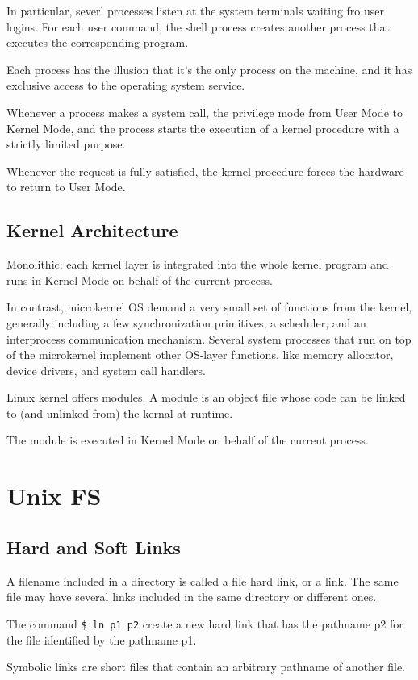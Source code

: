 \documentclass[a4paper,10pt]{book}
\begin{document}
In particular, severl processes listen at the system terminals waiting fro user
logins. For each user command, the shell process creates another process that
executes the corresponding program.

Each process has the illusion that it's the only process on the machine, and it
has exclusive access to the operating system service.

Whenever a process makes a system call, the privilege mode from User Mode to
Kernel Mode, and the process starts the execution of a kernel procedure with a
strictly limited purpose.

Whenever the request is fully satisfied, the kernel procedure forces the
hardware to return to User Mode.
\subsection{Kernel Architecture}
Monolithic: each kernel layer is integrated into the whole kernel program and
runs in Kernel Mode on behalf of the current process.

In contrast, microkernel OS demand a very small set of functions from the
kernel, generally including a few synchronization primitives, a scheduler, and
an interprocess communication mechanism.  Several system processes that run on
top of the microkernel implement other OS-layer functions. like memory
allocator, device drivers, and system call handlers.

Linux kernel offers modules. A module is an object file whose code can be linked
to (and unlinked from) the kernal at runtime.

The module is executed in Kernel Mode on behalf of the current process.
\section{Unix FS}
\subsection{Hard and Soft Links}
A filename included in a directory is called a file hard link, or a link. The
same file may have several links included in the same directory or different
ones.

The command \verb|$ ln p1 p2| create a new hard link that has the pathname p2
for the file identified by the pathname p1.

Symbolic links are short files that contain an arbitrary pathname of another
file. 
\end{document}
